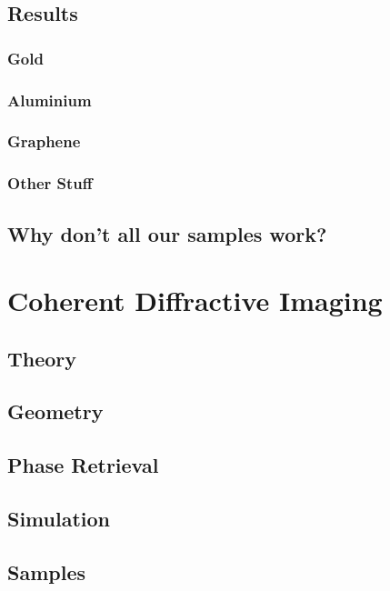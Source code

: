 \section{Results}

\subsection{Gold}

\subsection{Aluminium}

\subsection{Graphene}

\subsection{Other Stuff}

\section{Why don't all our samples work?}






\chapter{Coherent Diffractive Imaging}

\section{Theory}

\section{Geometry}

\section{Phase Retrieval}

\section{Simulation}

\section{Samples}

